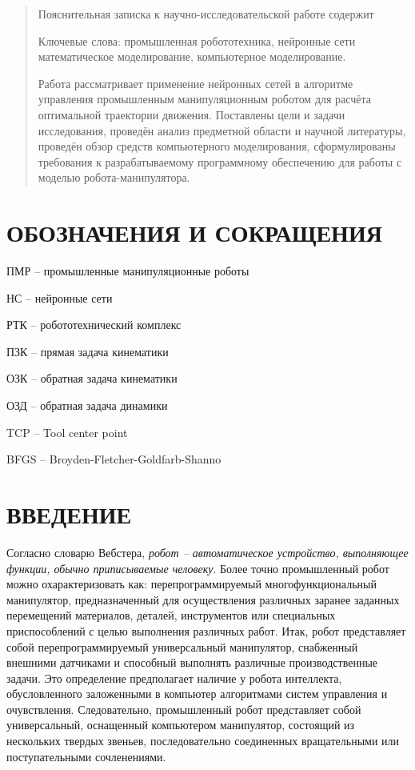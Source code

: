 \newpage

\begin{abstract}

Пояснительная записка к научно-исследовательской работе содержит \printtotpage \printtotfig \printtottab \printtotref \printtotapp[.]

Ключевые слова: промышленная робототехника, нейронные сети математическое моделирование, компьютерное моделирование.

Работа рассматривает применение нейронных сетей в алгоритме управления промышленным манипуляционным роботом для расчёта оптимальной траектории движения. Поставлены цели и задачи исследования, проведён анализ предметной области и научной литературы, проведён обзор средств компьютерного моделирования, сформулированы требования к разрабатываемому программному обеспечению для работы с моделью робота-манипулятора.
\end{abstract}

\tableofcontents


\section*{ОБОЗНАЧЕНИЯ И СОКРАЩЕНИЯ}
ПМР -- промышленные манипуляционные роботы

НС -- нейронные сети

РТК -- робототехнический комплекс

ПЗК -- прямая задача кинематики

ОЗК -- обратная задача кинематики

ОЗД -- обратная задача динамики

TCP -- Tool center point

BFGS -- Broyden-Fletcher-Goldfarb-Shanno

\section*{ВВЕДЕНИЕ}

Согласно словарю Вебстера, \textit{робот -- автоматическое устройство,\hspace{0,2cm} выполняющее функции, обычно приписываемые человеку}. Более точно промышленный робот можно охарактеризовать как: перепрограммируемый многофункциональный манипулятор, предназначенный для осуществления различных заранее заданных перемещений материалов, деталей, инструментов или специальных приспособлений с целью выполнения различных работ. Итак, робот представляет собой перепрограммируемый универсальный манипулятор, снабженный внешними датчиками и способный выполнять различные производственные задачи. Это определение предполагает наличие у робота интеллекта, обусловленного заложенными в компьютер алгоритмами систем управления и очувствления.
Следовательно, промышленный робот представляет собой универсальный, оснащенный компьютером манипулятор, состоящий из нескольких твердых звеньев, последовательно соединенных вращательными или поступательными сочленениями. \cite{Fu_Robot_Book}

